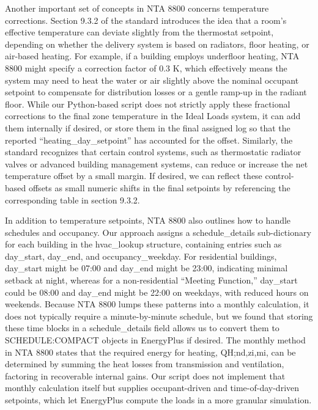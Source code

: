 Another important set of concepts in NTA 8800 concerns temperature corrections. Section 9.3.2 of the standard introduces the idea that a room’s effective temperature can deviate slightly from the thermostat setpoint, depending on whether the delivery system is based on radiators, floor heating, or air-based heating. For example, if a building employs underfloor heating, NTA 8800 might specify a correction factor of 0.3 K, which effectively means the system may need to heat the water or air slightly above the nominal occupant setpoint to compensate for distribution losses or a gentle ramp-up in the radiant floor. While our Python-based script does not strictly apply these fractional corrections to the final zone temperature in the Ideal Loads system, it can add them internally if desired, or store them in the final assigned log so that the reported “heating_day_setpoint” has accounted for the offset. Similarly, the standard recognizes that certain control systems, such as thermostatic radiator valves or advanced building management systems, can reduce or increase the net temperature offset by a small margin. If desired, we can reflect these control-based offsets as small numeric shifts in the final setpoints by referencing the corresponding table in section 9.3.2.

In addition to temperature setpoints, NTA 8800 also outlines how to handle schedules and occupancy. Our approach assigns a schedule_details sub-dictionary for each building in the hvac_lookup structure, containing entries such as day_start, day_end, and occupancy_weekday. For residential buildings, day_start might be 07:00 and day_end might be 23:00, indicating minimal setback at night, whereas for a non-residential “Meeting Function,” day_start could be 08:00 and day_end might be 22:00 on weekdays, with reduced hours on weekends. Because NTA 8800 lumps these patterns into a monthly calculation, it does not typically require a minute-by-minute schedule, but we found that storing these time blocks in a schedule_details field allows us to convert them to SCHEDULE:COMPACT objects in EnergyPlus if desired. The monthly method in NTA 8800 states that the required energy for heating, QH;nd,zi,mi, can be determined by summing the heat losses from transmission and ventilation, factoring in recoverable internal gains. Our script does not implement that monthly calculation itself but supplies occupant-driven and time-of-day-driven setpoints, which let EnergyPlus compute the loads in a more granular simulation. 

